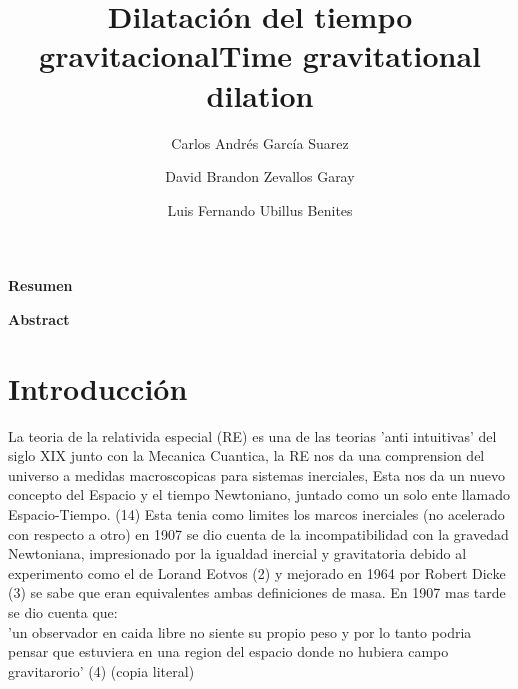 \documentclass[12pt,twoside]{rif}
\title{\textbf{Dilatación del tiempo gravitacional}}
\author[1]{{\small Carlos Andrés García Suarez}}
\author[1]{{\small David Brandon Zevallos Garay}}
\author[1]{{\small Luis Fernando Ubillus Benites}}
\affil[1]{{ \small Facultad de Ciencias Naturales y Matemática, Universidad
		Nacional Federico Villarreal. El Agustino 15003. Lima-Perú.}}
\date{}
\begin{document}
	\maketitle
	
	\begin{res}
		\begin{center}
			\textbf{Resumen} \\
		\end{center}
		\lipsum[2]
		
		\par
		\smallskip
	\end{res}
	\begin{center}
		\title{\textbf{Time gravitational dilation}}
	\end{center}
	
	\begin{abst}
		\begin{center}
			\textbf{Abstract} \\
		\end{center}
		\lipsum[2]
		
		\par 
		\smallskip
	\end{abst}

	
	
	\newpage
	
	\tableofcontents
	
	\section{ Introducción} 
	La teoria de la relativida especial (RE) es una de las teorias 'anti intuitivas' del siglo XIX junto con la Mecanica
Cuantica, la RE nos da una comprension del universo a medidas macroscopicas para sistemas inerciales, Esta nos da un nuevo
concepto del Espacio y el tiempo Newtoniano, juntado como un solo ente llamado Espacio-Tiempo. (14)
Esta tenia como limites los marcos inerciales (no acelerado con respecto a otro) en 1907 se dio cuenta de la
incompatibilidad con la gravedad Newtoniana, impresionado por la igualdad inercial y gravitatoria debido al experimento 
como el de Lorand Eotvos (2) y mejorado en 1964 por Robert Dicke (3) se sabe que eran equivalentes ambas definiciones de masa.
En 1907 mas tarde se dio cuenta que: \\

 'un observador en caida libre no siente su propio peso y por lo tanto podria pensar que estuviera en una region del espacio donde no hubiera campo gravitarorio' (4) (copia literal)\\
\end{document}
